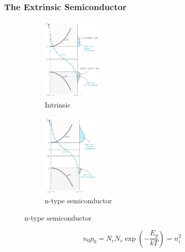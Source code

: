 \documentclass{beamer}
\begin{document}
    \begin{frame} \frametitle{The Extrinsic Semiconductor}
        \begin{figure}[H]
            \centering
            \begin{subfigure}[b]{0.45\linewidth}
                \centering
                \includegraphics[height=4cm]{Intrinsic.jpg}
                \caption{Intrinsic}
                \label{subfig:Intrinsic.jpg}
            \end{subfigure}
            \begin{subfigure}[b]{0.45\linewidth}
                \centering
                \includegraphics[height=4cm]{Extrinsic-n-type.jpg}
                \caption{n-type semiconductor}
                \label{subfig:Extrinsic-n-type.jpg}
            \end{subfigure}
            \label{fig:subcaption-of-dopants}
        \end{figure}
        \begin{equation*}
            \boxed{n_0p_0 = N_c N_v \exp \left( -\frac{E_g}{kT}  \right) = n_i^2}
        \end{equation*}
    \end{frame}
\end{document}
